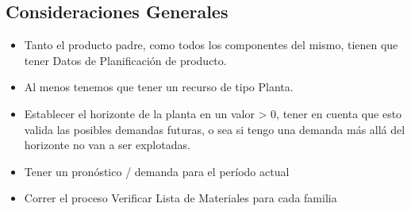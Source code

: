 \documentclass[letterpaper,10pt,spanish]{sphinxmanual}
\begin{document}
\subsection{Consideraciones Generales}
\label{manufactura-checklist:consideraciones-generales}\begin{itemize}
\item {} 
Tanto el producto padre, como todos los componentes del mismo, tienen que tener Datos de Planificación de producto.

\item {} 
Al menos tenemos que tener un recurso de tipo Planta.

\item {} 
Establecer el horizonte de la planta en un valor \textgreater{} 0, tener en cuenta que esto valida las posibles demandas futuras, o sea si tengo una demanda más allá del horizonte no van a ser explotadas.

\item {} 
Tener un pronóstico / demanda para el período actual

\item {} 
Correr el proceso Verificar Lista de Materiales para cada familia

\end{itemize}
\end{document}
